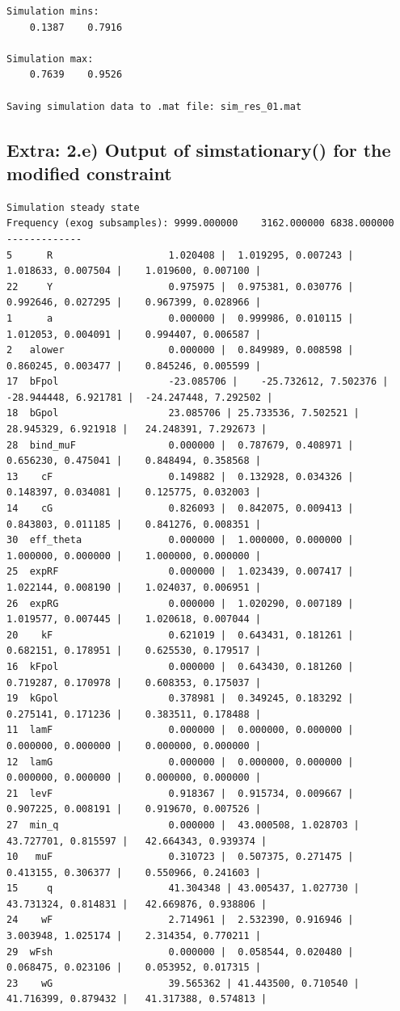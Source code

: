 \documentclass{article}
\begin{document}
\begin{verbatim}
Simulation mins:
    0.1387    0.7916

Simulation max:
    0.7639    0.9526

Saving simulation data to .mat file: sim_res_01.mat
\end{verbatim} \color{black}

\subsection*{Extra: 2.e) Output of sim\textunderscore stationary() for the modified constraint}


\color{lightgray} \begin{verbatim} 
Simulation steady state
Frequency (exog subsamples): 9999.000000	3162.000000	6838.000000	
-------------
5	   R					1.020408 |	1.019295, 0.007243 |	1.018633, 0.007504 |	1.019600, 0.007100 |
22	   Y					0.975975 |	0.975381, 0.030776 |	0.992646, 0.027295 |	0.967399, 0.028966 |
1	   a					0.000000 |	0.999986, 0.010115 |	1.012053, 0.004091 |	0.994407, 0.006587 |
2	alower					0.000000 |	0.849989, 0.008598 |	0.860245, 0.003477 |	0.845246, 0.005599 |
17	bFpol					-23.085706 |	-25.732612, 7.502376 |	-28.944448, 6.921781 |	-24.247448, 7.292502 |
18	bGpol					23.085706 |	25.733536, 7.502521 |	28.945329, 6.921918 |	24.248391, 7.292673 |
28	bind_muF				0.000000 |	0.787679, 0.408971 |	0.656230, 0.475041 |	0.848494, 0.358568 |
13	  cF					0.149882 |	0.132928, 0.034326 |	0.148397, 0.034081 |	0.125775, 0.032003 |
14	  cG					0.826093 |	0.842075, 0.009413 |	0.843803, 0.011185 |	0.841276, 0.008351 |
30	eff_theta				0.000000 |	1.000000, 0.000000 |	1.000000, 0.000000 |	1.000000, 0.000000 |
25	expRF					0.000000 |	1.023439, 0.007417 |	1.022144, 0.008190 |	1.024037, 0.006951 |
26	expRG					0.000000 |	1.020290, 0.007189 |	1.019577, 0.007445 |	1.020618, 0.007044 |
20	  kF					0.621019 |	0.643431, 0.181261 |	0.682151, 0.178951 |	0.625530, 0.179517 |
16	kFpol					0.000000 |	0.643430, 0.181260 |	0.719287, 0.170978 |	0.608353, 0.175037 |
19	kGpol					0.378981 |	0.349245, 0.183292 |	0.275141, 0.171236 |	0.383511, 0.178488 |
11	lamF					0.000000 |	0.000000, 0.000000 |	0.000000, 0.000000 |	0.000000, 0.000000 |
12	lamG					0.000000 |	0.000000, 0.000000 |	0.000000, 0.000000 |	0.000000, 0.000000 |
21	levF					0.918367 |	0.915734, 0.009667 |	0.907225, 0.008191 |	0.919670, 0.007526 |
27	min_q					0.000000 |	43.000508, 1.028703 |	43.727701, 0.815597 |	42.664343, 0.939374 |
10	 muF					0.310723 |	0.507375, 0.271475 |	0.413155, 0.306377 |	0.550966, 0.241603 |
15	   q					41.304348 |	43.005437, 1.027730 |	43.731324, 0.814831 |	42.669876, 0.938806 |
24	  wF					2.714961 |	2.532390, 0.916946 |	3.003948, 1.025174 |	2.314354, 0.770211 |
29	wFsh					0.000000 |	0.058544, 0.020480 |	0.068475, 0.023106 |	0.053952, 0.017315 |
23	  wG					39.565362 |	41.443500, 0.710540 |	41.716399, 0.879432 |	41.317388, 0.574813 |
 

\end{verbatim}
\end{document}
